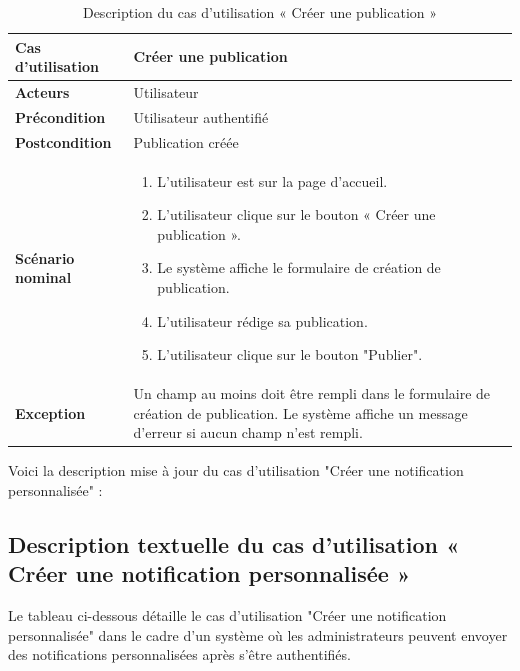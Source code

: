 \begin{sloppypar}
\begin{table}[h]
\centering
\begin{tabular}{|p{3cm}|p{11cm}|}
\hline
\textbf{Cas d'utilisation } & Créer une publication \\
\hline
\textbf{Acteurs} & Utilisateur \\
\hline
\textbf{Précondition} & Utilisateur authentifié \\
\hline
\textbf{Postcondition} & Publication créée \\
\hline
\textbf{Scénario nominal} & 
\begin{enumerate}
    \item L'utilisateur est sur la page d'accueil.
    \item L'utilisateur clique sur le bouton « Créer une publication ».
    \item Le système affiche le formulaire de création de publication.
    \item L'utilisateur rédige sa publication.
    \item L'utilisateur clique sur le bouton "Publier".
\end{enumerate} \\
\hline
\textbf{Exception} & 
Un champ au moins doit être rempli dans le formulaire de création de publication. Le système affiche un message d'erreur si aucun champ n'est rempli. \\
\hline
\end{tabular}
\caption{Description du cas d’utilisation « Créer une publication »}
\end{table}
\vspace{-4mm}
Voici la description mise à jour du cas d'utilisation "Créer une notification personnalisée" :
\vspace{-1cm}
\subsection{Description textuelle du cas d’utilisation « Créer une notification personnalisée »}
\vspace{-4mm}
Le tableau ci-dessous détaille le cas d'utilisation "Créer une notification personnalisée" dans le cadre d'un système où les administrateurs peuvent envoyer des notifications personnalisées après s'être authentifiés.


\end{sloppypar}
